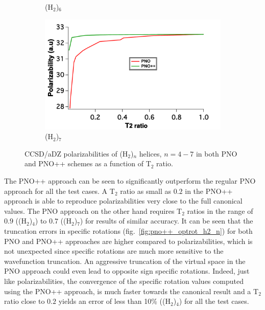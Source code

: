 \begin{figure}
\begin{subfigure}{.5\textwidth}
  \caption{(H$_2$)$_6$}
  \label{fig:sfig2}
\end{subfigure}
\begin{subfigure}{.5\textwidth}
  \centering
  \includegraphics[width=.9\linewidth]{figures_pno++/pno++_h2_7_adz_polar.pdf}
  \caption{(H$_2$)$_7$}
  \label{fig:sfig2}
\end{subfigure}
\caption{{\footnotesize CCSD/aDZ polarizabilities of
(H$_2$)$_n$ helices, $ n = 4-7$ in both PNO and PNO++ schemes as a function of
T$_2$ ratio.}}
\label{fig:pno++_polar_h2_n}
\end{figure}
The PNO++ approach can be seen to significantly outperform the regular PNO 
approach for all the test cases. A T$_2$ ratio as small as $0.2$ in the PNO++
approach is able to reproduce polarizabilities very close to the full canonical
values. The PNO approach on the other hand requires T$_2$ ratios in the range of 
$0.9$ ((H$_2$)$_4$) to $0.7$ ((H$_2$)$_7$) for results of similar accuracy.
It can be seen that the truncation errors in specific rotations (fig.~\ref{fig:pno++_optrot_h2_n})
for both PNO and PNO++ approaches are higher compared to polarizabilities, which is not 
unexpected since specific rotations are much more sensitive to the wavefunction truncation.
An aggressive truncation of the virtual space in the PNO approach could even lead
to opposite sign specific rotations. Indeed,
just like polarizabilities, the convergence of the specific rotation values 
computed using the PNO++ approach, is much faster towards the canonical result 
and a T$_2$ ratio close to $0.2$ yields an error of less than 10\% ((H$_2$)$_4$) 
for all the test cases.
